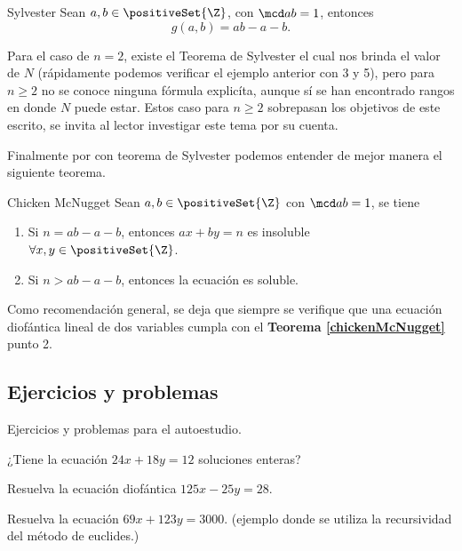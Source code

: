 \begin{theorem.box}{Sylvester}{}
Sean $a,b \in \positiveSet{\Z}$, con $\mcd a b = 1$, entonces
    \[
        g(a,b) = ab - a - b.
    \]
\end{theorem.box}

Para el caso de $n=2$, existe el Teorema de Sylvester el cual nos brinda el valor de $N$
(rápidamente podemos verificar el ejemplo anterior con 3 y 5),
pero para $n\geq2$ no se conoce ninguna fórmula explicíta, aunque sí se han encontrado rangos en donde $N$ puede estar.
Estos caso para $n\geq2$ sobrepasan los objetivos de este escrito, se invita al lector investigar este tema por su cuenta.

Finalmente por con teorema de Sylvester podemos entender de mejor manera el siguiente teorema.

\begin{theorem.box}{Chicken McNugget}{}\label{chickenMcNugget}
    Sean $a, b\in \positiveSet{\Z}$ con $\mcd a b = 1$, se tiene
    \begin{enumerate}
        \item Si $n = ab - a - b$, entonces $ax + by = n$ es insoluble $\forall x, y \in \positiveSet{\Z}$.
        \item Si $n > ab - a - b$, entonces la ecuación es soluble.
    \end{enumerate}
\end{theorem.box}

Como recomendación general, se deja que siempre se verifique que una ecuación diofántica lineal de dos variables
cumpla con el \textbf{Teorema \ref{chickenMcNugget}} punto 2.




\subsection{Ejercicios y problemas}

Ejercicios y problemas para el autoestudio.

\begin{exercise}
    ¿Tiene la ecuación $24x+18y=12$ soluciones enteras?
\end{exercise}

\begin{exercise}
    Resuelva la ecuación diofántica $125x-25y=28.$
\end{exercise}

\begin{exercise}
    Resuelva la ecuación $69x+123y=3000.$
    (ejemplo donde se utiliza la recursividad del método de euclides.)
\end{exercise}